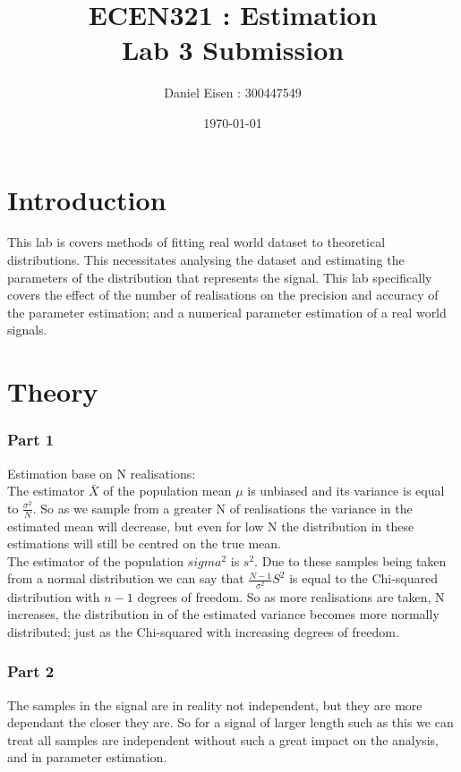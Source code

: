 \documentclass[11pt]{article}
\title{ECEN321 : Estimation \\ Lab 3 Submission}
\author{Daniel Eisen : 300447549}
\date{\today}
\begin{document}
\begin{preview}
\maketitle
\section{Introduction}
This lab is covers methods of fitting real world dataset to theoretical distributions. This necessitates analysing the dataset and estimating the parameters of the distribution that represents the signal. This lab specifically covers the effect of the number of realisations on the precision and accuracy of the parameter estimation; and a numerical parameter estimation of a real world signals.
\section{Theory}
\subsubsection*{Part 1}
Estimation base on N realisations:\\

The estimator $\bar{X}$ of the population mean $\mu$ is unbiased and its variance is equal to $\frac{\sigma^2}{N}$. So as we sample from a greater N of realisations the variance in the estimated mean will decrease, but even for low N the distribution in these estimations will still be centred on the true mean.\\

The estimator of the population $sigma^2$ is $s^2$.
Due to these samples being taken from a normal distribution we can say that $\frac{N-1}{\sigma^2}S^2$ is equal to the Chi-squared distribution with $n-1$ degrees of freedom. So as more realisations are taken, N increases, the distribution in of the estimated variance becomes more normally distributed; just as the Chi-squared with increasing degrees of freedom.


\subsubsection*{Part 2}
The samples in the signal are in reality not independent, but they are more dependant the closer they are. So for a signal of larger length such as this we can treat all samples are independent without such a great impact on the analysis, and in parameter estimation. \\


\end{preview}
\end{document}
